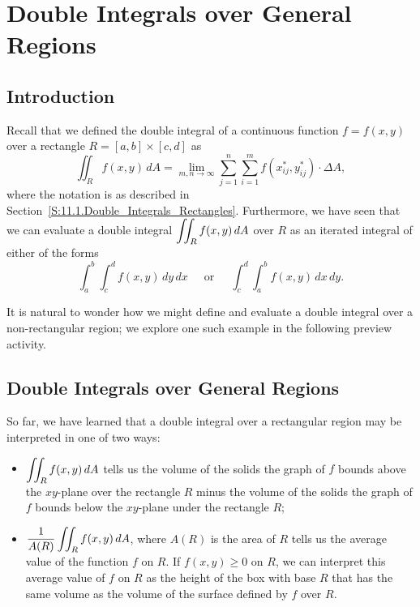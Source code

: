\section{Double Integrals over General Regions} \label{S:11.3.Double_Integrals_General}

\vspace*{-14 pt}

\subsection*{Introduction}

Recall that we defined the double integral of a continuous function $f = f(x,y)$ over a rectangle $R = [a,b] \times [c,d]$ as
\[\iint_R f(x,y) \, dA = \lim_{m,n \to \infty} \sum_{j=1}^n \sum_{i=1}^m f(x_{ij}^*, y_{ij}^*) \cdot \Delta A,\]
where the notation is as described in Section~\ref{S:11.1.Double_Integrals_Rectangles}.  Furthermore, we have seen that we can evaluate a double integral $\displaystyle \iint_R f(x,y) \, dA$ over $R$ as an iterated integral of either of the forms
\[\int_a^b \int_c^d f(x,y) \, dy \, dx \ \ \ \ \ \text{ or } \ \ \ \ \ \int_c^d \int_a^b f(x,y) \, dx \, dy.\]

It is natural to wonder how we might define and evaluate a double integral over a non-rectangular region; we explore one such example in the following preview activity.



\subsection*{Double Integrals over General Regions}

So far, we have learned that a double integral over a rectangular region may be interpreted in one of two ways:
\begin{itemize}
\item $\displaystyle \iint_R f(x,y) \, dA$ tells us the volume of the solids the graph of $f$ bounds above the $xy$-plane over the rectangle $R$ minus the volume of the solids the graph of $f$ bounds below the $xy$-plane under the rectangle $R$;
\item $\displaystyle \frac{1}{A(R)} \iint_R f(x,y) \, dA$, where $A(R)$ is the area of $R$ tells us the average value of the function $f$ on $R$. If $f(x, y) \geq  0$ on $R$, we can interpret this average value of $f$ on $R$ as the height of the box with base $R$ that has the same volume as the volume of the surface defined by $f$ over $R$.
\end{itemize}


